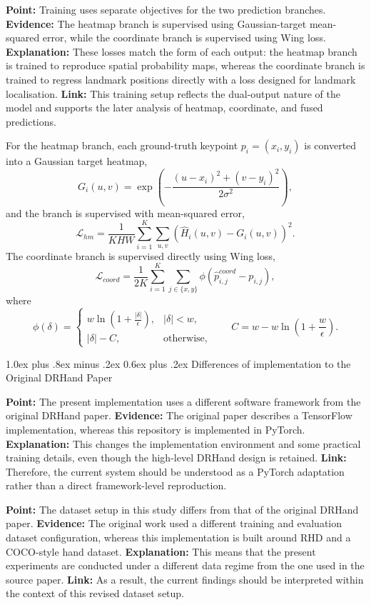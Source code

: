 \documentclass[10pt,letterpaper]{article}
\makeatletter
\renewcommand\subsection{\@startsection{subsection}{2}{\z@}%
  {1.0ex plus .8ex minus .2ex}%
  {0.6ex plus .2ex}%
  {\normalfont\itshape}}
\makeatother
\begin{document}
\medskip
\noindent\textbf{Point:} Training uses separate objectives for the two prediction branches.  
\textbf{Evidence:} The heatmap branch is supervised using Gaussian-target mean-squared error, while the coordinate branch is supervised using Wing loss.  
\textbf{Explanation:} These losses match the form of each output: the heatmap branch is trained to reproduce spatial probability maps, whereas the coordinate branch is trained to regress landmark positions directly with a loss designed for landmark localisation.  
\textbf{Link:} This training setup reflects the dual-output nature of the model and supports the later analysis of heatmap, coordinate, and fused predictions.

For the heatmap branch, each ground-truth keypoint $p_i = (x_i, y_i)$ is converted into a Gaussian target heatmap,
\[
G_i(u,v) = \exp\left(
-\frac{(u-x_i)^2 + (v-y_i)^2}{2\sigma^2}
\right),
\]
and the branch is supervised with mean-squared error,
\[
\mathcal{L}_{hm}
=
\frac{1}{KHW}
\sum_{i=1}^{K}
\sum_{u,v}
\left(\hat{H}_i(u,v) - G_i(u,v)\right)^2.
\]
The coordinate branch is supervised directly using Wing loss,
\[
\mathcal{L}_{coord}
=
\frac{1}{2K}
\sum_{i=1}^{K}
\sum_{j \in \{x,y\}}
\phi\!\left(\hat{p}^{coord}_{i,j} - p_{i,j}\right),
\]
where
\[
\phi(\delta)=
\begin{cases}
w \ln\left(1 + \frac{|\delta|}{\epsilon}\right), & |\delta| < w, \\
|\delta| - C, & \text{otherwise,}
\end{cases}
\qquad
C = w - w \ln\left(1 + \frac{w}{\epsilon}\right).
\]

\subsection{Differences of implementation to the Original DRHand Paper}

\noindent\textbf{Point:} The present implementation uses a different software framework from the original DRHand paper.  
\textbf{Evidence:} The original paper describes a TensorFlow implementation, whereas this repository is implemented in PyTorch.  
\textbf{Explanation:} This changes the implementation environment and some practical training details, even though the high-level DRHand design is retained.  
\textbf{Link:} Therefore, the current system should be understood as a PyTorch adaptation rather than a direct framework-level reproduction.

\medskip
\noindent\textbf{Point:} The dataset setup in this study differs from that of the original DRHand paper.  
\textbf{Evidence:} The original work used a different training and evaluation dataset configuration, whereas this implementation is built around RHD and a COCO-style hand dataset.  
\textbf{Explanation:} This means that the present experiments are conducted under a different data regime from the one used in the source paper.  
\textbf{Link:} As a result, the current findings should be interpreted within the context of this revised dataset setup.
\end{document}
